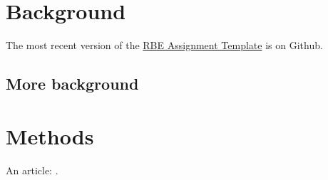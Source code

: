 \documentclass{RBEassignment}
\begin{document}
\def\RBEtitle{Creating an Assignment from the RBEassignment Class}
\def\RBEcourse{RBE-001 Generic RBE Course}
\def\RBEsemester{Fall 2021}
\def\RBEauthor{Daniel Montrallo Flickinger, PhD}
\def\RBEnumber{0}
\def\RBEdue{2021-01-01 @ 00:00 UTC}



\RBEassignmentheader{}



\section{Background}


The most recent version of the \href{https://github.com/dmflickinger/RBE550-assignment-template}{RBE Assignment Template} is on Github.  

\lipsum[2]

\subsection{More background}

\lipsum[3]

\section{Methods}

\lipsum[4]

An article: \cite{WSJrobotRescue}.






\printurls
\end{document}
